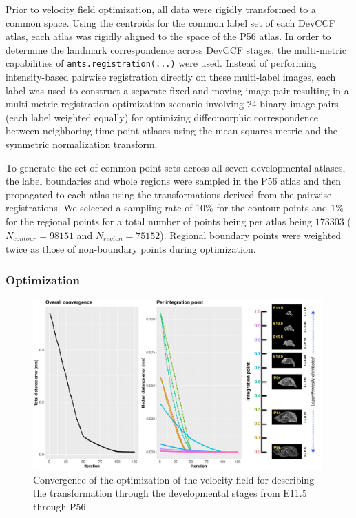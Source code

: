 \documentclass[
  12pt,
]{article}
\begin{document}
Prior to velocity field optimization, all data were rigidly transformed
to a common space. Using the centroids for the common label set of each
DevCCF atlas, each atlas was rigidly aligned to the space of the P56
atlas. In order to determine the landmark correspondence across DevCCF
stages, the multi-metric capabilities of \texttt{ants.registration(...)}
were used. Instead of performing intensity-based pairwise registration
directly on these multi-label images, each label was used to construct a
separate fixed and moving image pair resulting in a multi-metric
registration optimization scenario involving 24 binary image pairs (each
label weighted equally) for optimizing diffeomorphic correspondence
between neighboring time point atlases using the mean squares metric and
the symmetric normalization transform.

To generate the set of common point sets across all seven developmental
atlases, the label boundaries and whole regions were sampled in the P56
atlas and then propagated to each atlas using the transformations
derived from the pairwise registrations. We selected a sampling rate of
10\% for the contour points and 1\% for the regional points for a total
number of points being per atlas being \(173303\)
(\(N_{contour} = 98151\) and \(N_{region}=75152\)). Regional boundary
points were weighted twice as those of non-boundary points during
optimization.

\hypertarget{optimization}{%
\subsubsection{Optimization}\label{optimization}}

\begin{figure}[!htb]
\centering
\includegraphics[width=0.99\textwidth]{Figures/convergence.pdf}
\caption{Convergence of the optimization of the velocity field for describing the 
transformation through the developmental stages from E11.5 through P56.}
\label{fig:convergence}
\end{figure}
\end{document}
